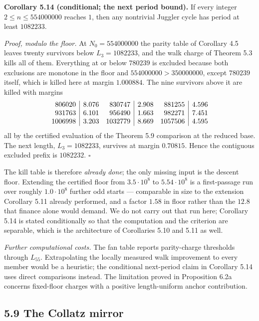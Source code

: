 \documentclass[12pt]{article}
\begin{document}
\textbf{Corollary 5.14 (conditional; the next period bound).} If every
integer \(2\le n\le 554000000\) reaches \(1\), then any nontrivial
Juggler cycle has period at least \(1082233\).

\emph{Proof, modulo the floor.} At \(N_0=554000000\) the parity table of
Corollary 4.5 leaves twenty survivors below \(L_3=1082233\), and the
walk charge of Theorem 5.3 kills all of them. Everything at or below
\(780239\) is excluded because both exclusions are monotone in the floor
and \(554000000>350000000\), except \(780239\) itself, which is killed
here at margin \(1.000884\). The nine survivors above it are killed with
margins \[
\begin{array}{r|r@{\quad}r|r@{\quad}r|r}
806020 & 8.076 & 830747 & 2.908 & 881255 & 4.596\\
931763 & 6.101 & 956490 & 1.663 & 982271 & 7.451\\
1006998 & 3.203 & 1032779 & 8.669 & 1057506 & 4.595
\end{array}
\] all by the certified evaluation of the Theorem 5.9 comparison at the
reduced base. The next length, \(L_3=1082233\), survives at margin
\(0.70815\). Hence the contiguous excluded prefix is \(1082232\).
\(\square\)

The kill table is therefore \emph{already done}; the only missing input
is the descent floor. Extending the certified floor from
\(3.5\cdot10^{8}\) to \(5.54\cdot10^{8}\) is a first-passage run over
roughly \(1.0\cdot10^{8}\) further odd starts --- comparable in size to
the extension Corollary 5.11 already performed, and a factor \(1.58\) in
floor rather than the \(12.8\) that finance alone would demand. We do
not carry out that run here; Corollary 5.14 is stated conditionally so
that the computation and the criterion are separable, which is the
architecture of Corollaries 5.10 and 5.11 as well.

\emph{Further computational costs.} The fan table reports parity-charge
thresholds through \(L_{55}\). Extrapolating the locally measured walk
improvement to every member would be a heuristic; the conditional
next-period claim in Corollary 5.14 uses direct comparisons instead. The
limitation proved in Proposition 6.2a concerns fixed-floor charges with
a positive length-uniform anchor contribution.

\subsection{5.9 The Collatz mirror}\label{the-collatz-mirror}
\end{document}
